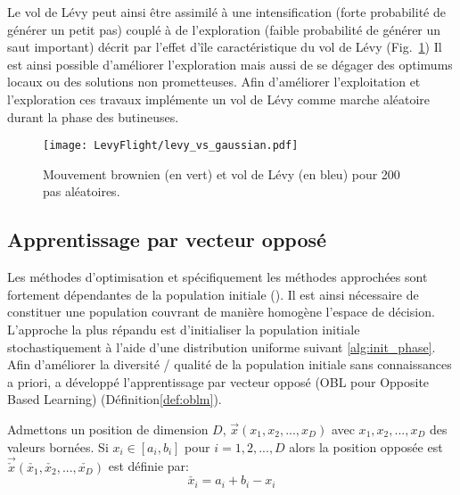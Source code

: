 Le vol de Lévy peut ainsi être assimilé à une intensification (forte probabilité de générer un petit pas)
couplé à de l’exploration (faible probabilité de générer un saut important) décrit par
l’effet d’île caractéristique du vol de Lévy (Fig.~\ref{fig:levy_vs_gaussian})
Il est ainsi possible d’améliorer l’exploration mais aussi de se dégager des optimums
locaux ou des solutions non prometteuses. Afin d’améliorer l’exploitation et l’exploration
ces travaux implémente un vol de Lévy comme marche aléatoire durant la phase des butineuses.

\begin{figure}
    \begin{center}
        \texttt{[image: LevyFlight/levy\_vs\_gaussian.pdf]}
    \end{center}
    \caption{Mouvement brownien (en vert) et vol de Lévy (en bleu) pour 200 pas aléatoires.
             \label{fig:levy_vs_gaussian}}
\end{figure}
\FloatBarrier


\subsection{Apprentissage par vecteur opposé} %
\label{sub:apprentissage_par_vecteur_oppose}
Les méthodes d’optimisation et spécifiquement les méthodes approchées sont fortement
dépendantes de la population initiale (). Il est ainsi nécessaire
de constituer une population couvrant de manière homogène l’espace de décision.
L’approche la plus répandu est d’initialiser la population initiale stochastiquement
à l’aide d’une distribution uniforme suivant \eqref{alg:init_phase}.
Afin d’améliorer la diversité / qualité de la population initiale sans connaissances
a priori,\cite{Tizhoosh2005695} a développé l’apprentissage par vecteur opposé
(OBL pour Opposite Based Learning) (Définition\ref{def:oblm}).

\begin{Def}\label{def:oblm}
Admettons un position de dimension $D$, $\vec{x}(x_{1}, x_{2}, ..., x_{D})$ avec
$x_{1}, x_{2}, ..., x_{D}$ des valeurs bornées. Si $x_{i} \in [a_{i}, b_{i}]$ pour
$i = 1, 2, ..., D$ alors la position opposée est $\vec{\check{x}}(\check{x_{1}},%
\check{x_{2}}, ..., \check{x_{D}})$ est définie par:
\[\check{x_{i}} = a_{i} + b_{i} - x_{i}\]
\end{Def}


